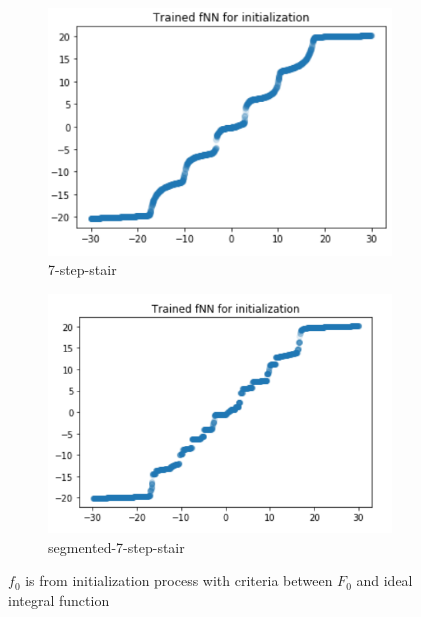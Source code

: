 \documentclass[conference,compsoc]{IEEEtran}
\begin{document}
\begin{figure}
  \centering
      \begin{subfigure}[b]{0.2\textwidth}            
              \includegraphics[width=\textwidth]{images/ICNN_f_init.png}
              \caption{7-step-stair}
      \end{subfigure}%
      \begin{subfigure}[b]{0.212\textwidth}
              \centering
              \includegraphics[width=\textwidth]{images/segmented_f_init.png}
              \caption{segmented-7-step-stair}
      \end{subfigure}
      \caption{$f_0$ is from initialization process with criteria between $F_0$ and ideal integral function}
      \label{fig:f_0 from initialization process with criteria between $F_0$ and ideal integral function}
  \end{figure}
\end{document}
